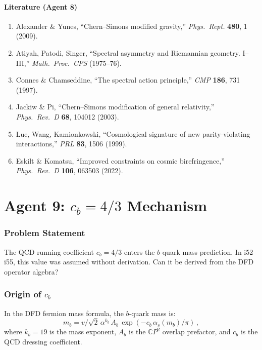 \documentclass[11pt,a4paper]{article}
\newcommand{\CP}{\mathbb{C}P}
\begin{document}
\subsection{Literature (Agent 8)}

\begin{enumerate}
\item Alexander \& Yunes, ``Chern--Simons modified gravity,'' \textit{Phys.\ Rept.} \textbf{480}, 1 (2009).
\item Atiyah, Patodi, Singer, ``Spectral asymmetry and Riemannian geometry. I--III,'' \textit{Math.\ Proc.\ CPS} (1975--76).
\item Connes \& Chamseddine, ``The spectral action principle,'' \textit{CMP} \textbf{186}, 731 (1997).
\item Jackiw \& Pi, ``Chern--Simons modification of general relativity,'' \textit{Phys.\ Rev.\ D} \textbf{68}, 104012 (2003).
\item Lue, Wang, Kamionkowski, ``Cosmological signature of new parity-violating interactions,'' \textit{PRL} \textbf{83}, 1506 (1999).
\item Eskilt \& Komatsu, ``Improved constraints on cosmic birefringence,'' \textit{Phys.\ Rev.\ D} \textbf{106}, 063503 (2022).
\end{enumerate}


\part{Agent 9: $c_b = 4/3$ Mechanism}
\label{part:cb}

\section{Problem Statement}

The QCD running coefficient $c_b = 4/3$ enters the $b$-quark mass prediction. In i52--i55, this value was assumed without derivation. Can it be derived from the DFD operator algebra?

\section{Origin of $c_b$}

In the DFD fermion mass formula, the $b$-quark mass is:
\begin{equation}
m_b = v/\sqrt{2}\,\alpha^{k_b}\,A_b\,\exp(-c_b\,\alpha_s(m_b)/\pi)\,,
\end{equation}
where $k_b = 19$ is the mass exponent, $A_b$ is the $\CP^2$ overlap prefactor, and $c_b$ is the QCD dressing coefficient.
\end{document}
